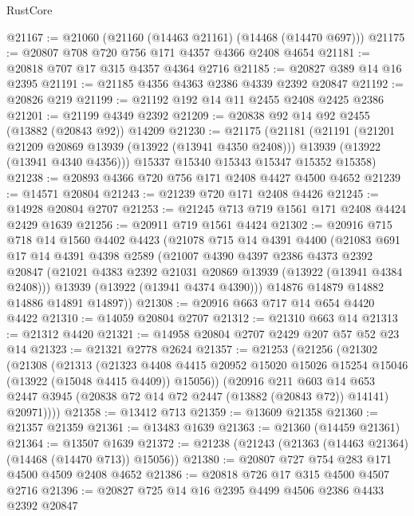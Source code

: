\begin{lexlean}{RustCore}
\begin{coremodule}
@21167 := @21060 (@21160 (@14463 @21161) (@14468 (@14470 @697)))
@21175 := @20807 @708 @720 @756 @171 @4357 @4366 @2408 @4654
@21181 := @20818 @707 @17 @315 @4357 @4364 @2716
@21185 := @20827 @389 @14 @16 @2395
@21191 := @21185 @4356 @4363 @2386 @4339 @2392 @20847
@21192 := @20826 @219
@21199 := @21192 @192 @14 @11 @2455 @2408 @2425 @2386
@21201 := @21199 @4349 @2392
@21209 := @20838 @92 @14 @92 @2455 (@13882 (@20843 @92)) @14209
@21230 := @21175
    (@21181
      (@21191
        (@21201 @21209 @20869 @13939 (@13922 (@13941 @4350 @2408)))
        @13939
        (@13922 (@13941 @4340 @4356)))
      @15337
      @15340
      @15343
      @15347
      @15352
      @15358)
@21238 := @20893 @4366 @720 @756 @171 @2408 @4427 @4500 @4652
@21239 := @14571 @20804
@21243 := @21239 @720 @171 @2408 @4426
@21245 := @14928 @20804 @2707
@21253 := @21245 @713 @719 @1561 @171 @2408 @4424 @2429 @1639
@21256 := @20911 @719 @1561 @4424
@21302 := @20916
    @715
    @718
    @14
    @1560
    @4402
    @4423
    (@21078
      @715
      @14
      @4391
      @4400
      (@21083
        @691
        @17
        @14
        @4391
        @4398
        @2589
        (@21007
          @4390
          @4397
          @2386
          @4373
          @2392
          @20847
          (@21021 @4383 @2392 @21031 @20869 @13939 (@13922 (@13941 @4384 @2408)))
          @13939
          (@13922 (@13941 @4374 @4390)))
        @14876
        @14879
        @14882
        @14886
        @14891
        @14897))
@21308 := @20916 @663 @717 @14 @654 @4420 @4422
@21310 := @14059 @20804 @2707
@21312 := @21310 @663 @14
@21313 := @21312 @4420
@21321 := @14958 @20804 @2707 @2429 @207 @57 @52 @23 @14
@21323 := @21321 @2778 @2624
@21357 := @21253
    (@21256
      (@21302
        (@21308
          (@21313
            (@21323
              @4408
              @4415
              @20952
              @15020
              @15026
              @15254
              @15046
              (@13922 (@15048 @4415 @4409))
              @15056))
          (@20916
            @211
            @603
            @14
            @653
            @2447
            @3945
            (@20838 @72 @14 @72 @2447 (@13882 (@20843 @72)) @14141)
            @20971))))
@21358 := @13412 @713
@21359 := @13609 @21358
@21360 := @21357 @21359
@21361 := @13483 @1639
@21363 := @21360 (@14459 @21361)
@21364 := @13507 @1639
@21372 := @21238 (@21243 (@21363 (@14463 @21364) (@14468 (@14470 @713)) @15056))
@21380 := @20807 @727 @754 @283 @171 @4500 @4509 @2408 @4652
@21386 := @20818 @726 @17 @315 @4500 @4507 @2716
@21396 := @20827 @725 @14 @16 @2395 @4499 @4506 @2386 @4433 @2392 @20847

\end{coremodule}
\end{lexlean}
